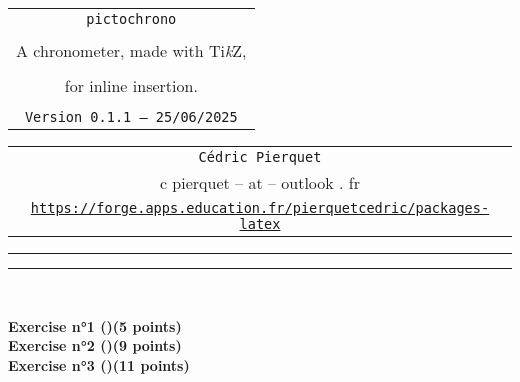 \documentclass[english,11pt,a4paper]{article}
\def\TPversion{0.1.1}
\def\TPdate{25/06/2025}
\begin{document}
\pagestyle{fancy}

\thispagestyle{empty}

\begin{center}
	\begin{minipage}{0.88\linewidth}
	\begin{tcolorbox}[colframe=yellow,colback=yellow!15]
		\begin{center}
			\begin{tabular}{c}
				{\Huge \texttt{pictochrono}}\\
				\\
				{\LARGE A chronometer, made with Ti\textit{k}Z,} \\
				\\
				{\LARGE for inline insertion.} \\
				\\
				{\small \texttt{Version \TPversion{} -- \TPdate}}
		\end{tabular}
		\end{center}
	\end{tcolorbox}
\end{minipage}
\end{center}

\begin{center}
	\begin{tabular}{c}
	\texttt{Cédric Pierquet}\\
	{\ttfamily c pierquet -- at -- outlook . fr}\\
	\texttt{\url{https://forge.apps.education.fr/pierquetcedric/packages-latex}}
\end{tabular}
\end{center}

\hrule


\hypertarget{matoc}{}

\tableofcontents

\vspace*{5mm}

\hrule

\vspace*{5mm}

\vfill

\begin{tcolorbox}[colframe=lightgray,colback=lightgray!10]
\hfill
{}
\hfill~
\end{tcolorbox}

\medskip

\begin{tcolorbox}[colframe=lightgray,colback=lightgray!10]
{\LARGE\bfseries\sffamily Exercise n°1 ()\dotfill(5 points)}\\
{\LARGE\bfseries\sffamily Exercise n°2 ()\dotfill(9 points)}\\
{\LARGE\bfseries\sffamily Exercise n°3 ()\dotfill(11 points)}
\end{tcolorbox}
\end{document}
